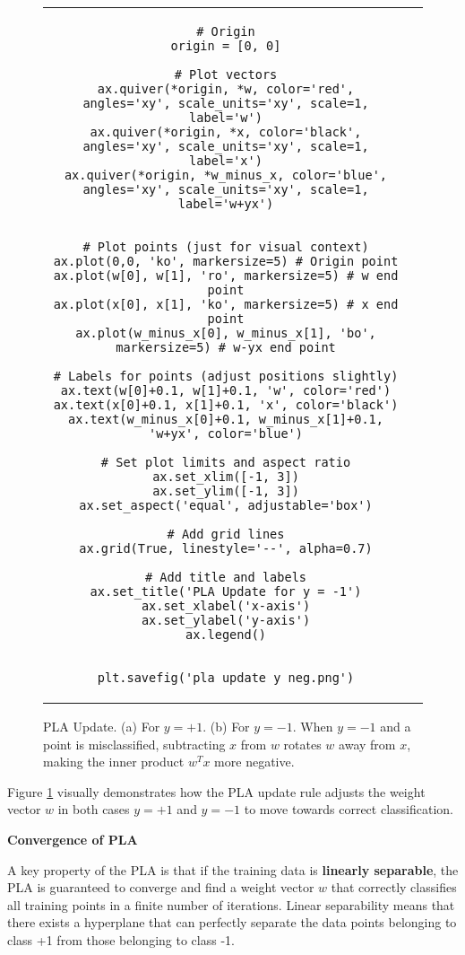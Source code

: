\documentclass{article}
\begin{document}
\begin{figure}[H]
\begin{tabular}{cc}
\begin{verbatim}
# Origin
origin = [0, 0]

# Plot vectors
ax.quiver(*origin, *w, color='red', angles='xy', scale_units='xy', scale=1, label='w')
ax.quiver(*origin, *x, color='black', angles='xy', scale_units='xy', scale=1, label='x')
ax.quiver(*origin, *w_minus_x, color='blue', angles='xy', scale_units='xy', scale=1, label='w+yx')


# Plot points (just for visual context)
ax.plot(0,0, 'ko', markersize=5) # Origin point
ax.plot(w[0], w[1], 'ro', markersize=5) # w end point
ax.plot(x[0], x[1], 'ko', markersize=5) # x end point
ax.plot(w_minus_x[0], w_minus_x[1], 'bo', markersize=5) # w-yx end point

# Labels for points (adjust positions slightly)
ax.text(w[0]+0.1, w[1]+0.1, 'w', color='red')
ax.text(x[0]+0.1, x[1]+0.1, 'x', color='black')
ax.text(w_minus_x[0]+0.1, w_minus_x[1]+0.1, 'w+yx', color='blue')

# Set plot limits and aspect ratio
ax.set_xlim([-1, 3])
ax.set_ylim([-1, 3])
ax.set_aspect('equal', adjustable='box')

# Add grid lines
ax.grid(True, linestyle='--', alpha=0.7)

# Add title and labels
ax.set_title('PLA Update for y = -1')
ax.set_xlabel('x-axis')
ax.set_ylabel('y-axis')
ax.legend()


plt.savefig('pla_update_y_neg.png')
        \end{verbatim}
        \caption{PLA Update. (a) For \(y = +1\). (b) For \(y = -1\). When \(y = -1\) and a point is misclassified, subtracting \(x\) from \(w\) rotates \(w\) away from \(x\), making the inner product \(w^T x\) more negative.}
        \label{fig:pla_update_rules}
    \end{tabular}
\end{figure}

Figure \ref{fig:pla_update_rules} visually demonstrates how the PLA update rule adjusts the weight vector \(w\) in both cases \(y=+1\) and \(y=-1\) to move towards correct classification.

\textbf{Convergence of PLA}

A key property of the PLA is that if the training data is \textbf{linearly separable}, the PLA is guaranteed to converge and find a weight vector \(w\) that correctly classifies all training points in a finite number of iterations. Linear separability means that there exists a hyperplane that can perfectly separate the data points belonging to class +1 from those belonging to class -1.
\end{document}
